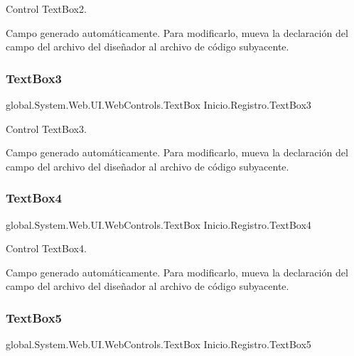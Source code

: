 Control Text\+Box2. 

Campo generado automáticamente. Para modificarlo, mueva la declaración del campo del archivo del diseñador al archivo de código subyacente. \mbox{\label{class_inicio_1_1_registro_adc45c7cdfd1ee0e80f517f1bb9e827ff}} 
\subsubsection{\texorpdfstring{TextBox3}{TextBox3}}
{\footnotesize\ttfamily global.\+System.\+Web.\+U\+I.\+Web\+Controls.\+Text\+Box Inicio.\+Registro.\+Text\+Box3\hspace{0.3cm}{\ttfamily [protected]}}



Control Text\+Box3. 

Campo generado automáticamente. Para modificarlo, mueva la declaración del campo del archivo del diseñador al archivo de código subyacente. \mbox{\label{class_inicio_1_1_registro_a835108d17c8690d089f9ee129b2ff7f3}} 
\subsubsection{\texorpdfstring{TextBox4}{TextBox4}}
{\footnotesize\ttfamily global.\+System.\+Web.\+U\+I.\+Web\+Controls.\+Text\+Box Inicio.\+Registro.\+Text\+Box4\hspace{0.3cm}{\ttfamily [protected]}}



Control Text\+Box4. 

Campo generado automáticamente. Para modificarlo, mueva la declaración del campo del archivo del diseñador al archivo de código subyacente. \mbox{\label{class_inicio_1_1_registro_a9bc70ac4aacbc0573d097586b9663f28}} 
\subsubsection{\texorpdfstring{TextBox5}{TextBox5}}
{\footnotesize\ttfamily global.\+System.\+Web.\+U\+I.\+Web\+Controls.\+Text\+Box Inicio.\+Registro.\+Text\+Box5\hspace{0.3cm}{\ttfamily [protected]}}



